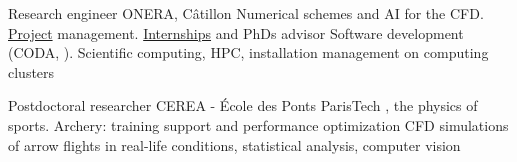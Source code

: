 \documentclass[english]{RMcv}
\begin{document}






%
%


%
        {Research engineer}%
        {ONERA, C\^{a}tillon}%
        {Numerical schemes and AI for the CFD. \href{\NextSimlink}{Project} management. \href{\articleJeanlink}{Internships} and PhDs advisor}%
        {Software development (CODA, \CoMMAhref). Scientific computing, HPC, installation management on computing clusters}

%
%
        {Postdoctoral researcher}%
        {CEREA - \'Ecole des Ponts ParisTech}%
        {\SciencesJOhref{}, the physics of sports. Archery: training support and performance optimization}%
        {CFD simulations of arrow flights in real-life conditions, statistical analysis, computer vision}
\end{document}

